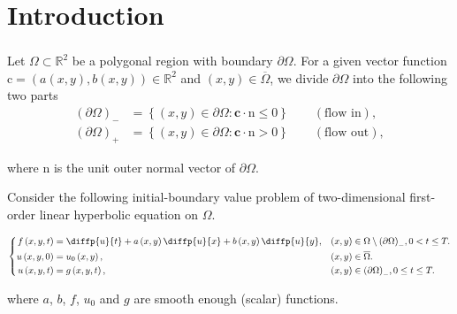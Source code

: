 \section{Introduction}

\begin{frame}
    \frametitle{\secname}
    Let $\Omega\subset\mathbb{R}^{2}$ be a polygonal region with
    boundary $\partial\Omega$.
    For a given vector function
    \begin{math}
        \bm{\mathrm{c}}=
        \left(
        a\left(x,y\right),
        b\left(x,y\right)
        \right)\in
        \mathbb{R}^{2}
    \end{math}
    and
    \begin{math}
        \left(x,y\right)\in
        \overline{\Omega}
    \end{math},
    we divide
    \begin{math}
        \partial\Omega
    \end{math}
    into the following two parts
    \begin{align*}
        {\left(\partial\Omega\right)}_{-}
         & =
        \left\{
        \left(x,y\right)\in\partial\Omega:
        \bm{c}\cdot\bm{\mathrm{n}}\leq 0
        \right\}\qquad
        (\text{flow in}), \\ %
        {\left(\partial\Omega\right)}_{+}
         & =
        \left\{
        \left(x,y\right)\in\partial\Omega:
        \bm{c}\cdot\bm{\mathrm{n}}> 0
        \right\}\qquad
        (\text{flow out}), %
    \end{align*}

    where $\bm{\mathrm{n}}$ is the unit outer normal vector of
    $\partial\Omega$.

    Consider the following initial-boundary value problem of
    two-dimensional \alert{first-order linear hyperbolic equation} on
    $\Omega$.

    \begin{equation*}
        \left\{
        \begin{aligned}
            f\left(x,y,t\right)    & =
            \diffp{u}{t}+
            a\left(x,y\right)
            \diffp{u}{x}+
            b\left(x,y\right)
            \diffp{u}{y},          &
            \left(x,y\right)       & \in
            \Omega\setminus
            {\left(\partial\Omega\right)}_{-},
            0<t\leq T.                   \\
            u\left(x,y,0\right)    & =
            u_{0}\left(x,y\right), &
            \left(x,y\right)       & \in
            \overline{\Omega}.           \\
            u\left(x,y,t\right)    & =
            g\left(x,y,t\right),   &
            \left(x,y\right)       & \in
            {\left(\partial\Omega\right)}_{-},
            0\leq t\leq T.
        \end{aligned}
        \right.
    \end{equation*}

    where $a$, $b$, $f$, $u_{0}$ and $g$ are smooth enough (scalar)
    functions.
\end{frame}

